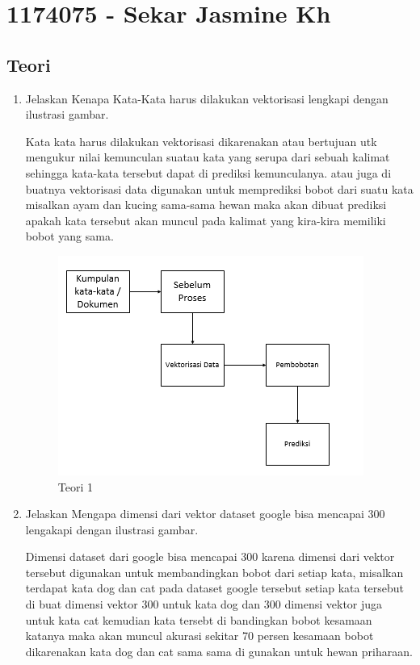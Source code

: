 \section{1174075 - Sekar Jasmine Kh}

\subsection{Teori}
\begin{enumerate}

\item Jelaskan Kenapa Kata-Kata harus dilakukan vektorisasi lengkapi dengan ilustrasi gambar.\par
Kata kata harus dilakukan vektorisasi dikarenakan atau bertujuan utk mengukur nilai kemunculan suatau kata yang serupa dari sebuah kalimat sehingga kata-kata tersebut dapat di prediksi kemunculanya. atau juga di buatnya vektorisasi data digunakan untuk memprediksi bobot dari suatu kata misalkan ayam dan kucing sama-sama hewan maka akan dibuat prediksi apakah kata tersebut akan muncul pada kalimat yang kira-kira memiliki bobot yang sama.

\begin{figure}[ht]
\centering
\includegraphics[scale=0.6]{figures/1174075/5/1,1.PNG}
\caption{Teori 1}
\label{contoh}
\end{figure}

\item Jelaskan Mengapa dimensi dari vektor dataset google bisa mencapai 300 lengakapi dengan ilustrasi gambar. \par
Dimensi dataset dari google bisa mencapai 300 karena dimensi dari vektor tersebut digunakan untuk membandingkan bobot dari setiap kata, misalkan terdapat kata dog dan cat pada dataset google tersebut setiap kata tersebut di buat dimensi vektor 300 untuk kata dog dan 300 dimensi vektor juga untuk kata cat kemudian kata tersebt di bandingkan bobot kesamaan katanya maka akan muncul akurasi sekitar 70 persen kesamaan bobot dikarenakan kata dog dan cat sama sama di gunakan untuk hewan priharaan.


\end{enumerate}
